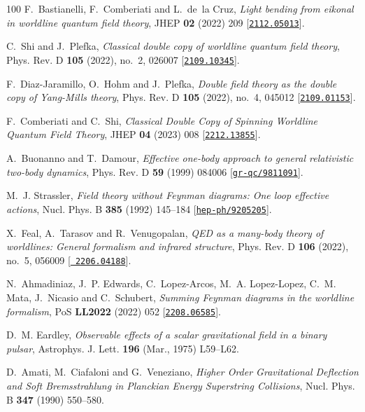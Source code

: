 \begin{thebibliography}{100}
F.~Bastianelli, F.~Comberiati and L.~de~la Cruz,  {\em {Light bending from
  eikonal in worldline quantum field theory}}, JHEP {\bf 02} (2022) 209
  [\href{http://www.arXiv.org/abs/2112.05013}{{\tt 2112.05013}}].

C.~Shi and J.~Plefka,  {\em {Classical double copy of worldline quantum field
  theory}}, Phys. Rev. D {\bf 105} (2022), no.~2, 026007
  [\href{http://www.arXiv.org/abs/2109.10345}{{\tt 2109.10345}}].

F.~Diaz-Jaramillo, O.~Hohm and J.~Plefka,  {\em {Double field theory as the
  double copy of Yang-Mills theory}}, Phys. Rev. D {\bf 105} (2022), no.~4,
  045012 [\href{http://www.arXiv.org/abs/2109.01153}{{\tt 2109.01153}}].

F.~Comberiati and C.~Shi,  {\em {Classical Double Copy of Spinning Worldline
  Quantum Field Theory}}, JHEP {\bf 04} (2023) 008
  [\href{http://www.arXiv.org/abs/2212.13855}{{\tt 2212.13855}}].

A.~Buonanno and T.~Damour,  {\em {Effective one-body approach to general
  relativistic two-body dynamics}}, Phys. Rev. D {\bf 59} (1999) 084006
  [\href{http://www.arXiv.org/abs/gr-qc/9811091}{{\tt gr-qc/9811091}}].

M.~J. Strassler,  {\em {Field theory without Feynman diagrams: One loop
  effective actions}}, Nucl. Phys. B {\bf 385} (1992) 145--184
  [\href{http://www.arXiv.org/abs/hep-ph/9205205}{{\tt hep-ph/9205205}}].

X.~Feal, A.~Tarasov and R.~Venugopalan,  {\em {QED as a many-body theory of
  worldlines: General formalism and infrared structure}}, Phys. Rev. D {\bf
  106} (2022), no.~5, 056009 [\href{http://www.arXiv.org/abs/2206.04188}{{\tt
  2206.04188}}].

N.~Ahmadiniaz, J.~P. Edwards, C.~Lopez-Arcos, M.~A. Lopez-Lopez, C.~M. Mata,
  J.~Nicasio and C.~Schubert,  {\em {Summing Feynman diagrams in the worldline
  formalism}}, PoS {\bf LL2022} (2022) 052
  [\href{http://www.arXiv.org/abs/2208.06585}{{\tt 2208.06585}}].

D.~M. {Eardley},  {\em {Observable effects of a scalar gravitational field in a
  binary pulsar}}, Astrophys. J. Lett. {\bf 196} (Mar., 1975) L59--L62.

D.~Amati, M.~Ciafaloni and G.~Veneziano,  {\em {Higher Order Gravitational
  Deflection and Soft Bremsstrahlung in Planckian Energy Superstring
  Collisions}}, Nucl. Phys. B {\bf 347} (1990) 550--580.


\end{thebibliography}
